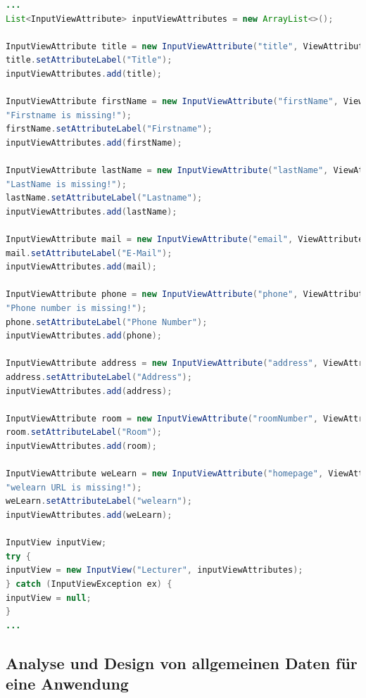 \begin{lstlisting}[label=lst:inputview_impl,
language=java,
firstnumber=1,
caption=Erstellung einer InputView]				   
...
List<InputViewAttribute> inputViewAttributes = new ArrayList<>();

InputViewAttribute title = new InputViewAttribute("title", ViewAttribute.AttributeType.TEXT, "Title", "Title is missing!");
title.setAttributeLabel("Title");
inputViewAttributes.add(title);

InputViewAttribute firstName = new InputViewAttribute("firstName", ViewAttribute.AttributeType.TEXT, "FirstName",
"Firstname is missing!");
firstName.setAttributeLabel("Firstname");
inputViewAttributes.add(firstName);

InputViewAttribute lastName = new InputViewAttribute("lastName", ViewAttribute.AttributeType.TEXT, "Lastname",
"LastName is missing!");
lastName.setAttributeLabel("Lastname");
inputViewAttributes.add(lastName);

InputViewAttribute mail = new InputViewAttribute("email", ViewAttribute.AttributeType.MAIL, "E-Mail", "E-Mail is missing!");
mail.setAttributeLabel("E-Mail");
inputViewAttributes.add(mail);

InputViewAttribute phone = new InputViewAttribute("phone", ViewAttribute.AttributeType.PHONE_NUMBER, "Phone Number",
"Phone number is missing!");
phone.setAttributeLabel("Phone Number");
inputViewAttributes.add(phone);

InputViewAttribute address = new InputViewAttribute("address", ViewAttribute.AttributeType.TEXT, "Address", "Address is missing!");
address.setAttributeLabel("Address");
inputViewAttributes.add(address);

InputViewAttribute room = new InputViewAttribute("roomNumber", ViewAttribute.AttributeType.TEXT, "Room", "Room is missing!");
room.setAttributeLabel("Room");
inputViewAttributes.add(room);

InputViewAttribute weLearn = new InputViewAttribute("homepage", ViewAttribute.AttributeType.URL, "welearn",
"welearn URL is missing!");
weLearn.setAttributeLabel("welearn");
inputViewAttributes.add(weLearn);

InputView inputView;
try {
inputView = new InputView("Lecturer", inputViewAttributes);
} catch (InputViewException ex) {
inputView = null;
}
...
\end{lstlisting}

\subsection{Analyse und Design von allgemeinen Daten für eine Anwendung}


